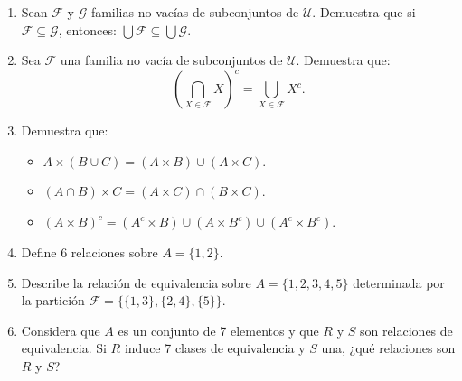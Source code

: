 \documentclass[11pt,answers]{exam}
\begin{document}
\begin{enumerate}
    \item Sean \( \mathscr{F} \) y \( \mathscr{G} \) familias no vacías de subconjuntos de \( \mathscr{U} \). Demuestra que si \( \mathscr{F} \subseteq \mathscr{G} \), entonces:
    \(\bigcup \mathscr{F} \subseteq \bigcup \mathscr{G}.\)

    

    \item Sea \( \mathscr{F} \) una familia no vacía de subconjuntos de \( \mathscr{U} \). Demuestra que:
    \[
    \left( \bigcap_{X \in \mathscr{F}} X \right)^c = \bigcup_{X \in \mathscr{F}} X^c.
    \]

    
    
    \item Demuestra que:
    \begin{itemize}
        \item $A \times (B \cup C) = (A \times B) \cup (A \times C)$.
        \item $(A \cap B) \times C = (A \times C) \cap (B \times C)$.
        \item $(A \times B)^c = (A^c \times B) \cup (A \times B^c) \cup (A^c \times B^c)$.
    \end{itemize}
        
    

    \item Define 6 relaciones sobre \( A = \{1, 2\} \).

    

    \item Describe la relación de equivalencia sobre \( A = \{1, 2, 3, 4, 5\} \) determinada por la partición \( \mathscr{F} = \{\{1, 3\}, \{2, 4\}, \{5\}\} \).

    

    \item Considera que \( A \) es un conjunto de 7 elementos y que \( R \) y \( S \) son relaciones de equivalencia. Si \( R \) induce 7 clases de equivalencia y \( S \) una, ¿qué relaciones son \( R \) y \( S \)?

    


\end{enumerate}
\end{document}
